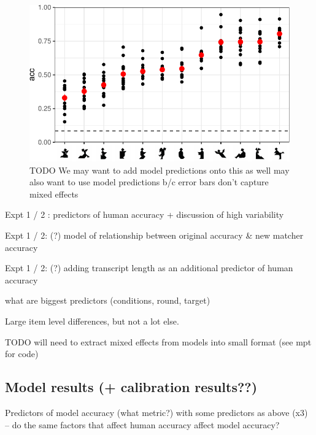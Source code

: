 \documentclass[10pt, letterpaper]{article}
\begin{document}
\begin{CodeChunk}
\begin{figure}[t]

{\centering \includegraphics[width=1\linewidth]{figs/fig-2-1} 

}

\caption[TODO We may want to add model predictions onto this as well may also want to use model predictions b/c error bars don't capture mixed effects \label{TODO2}]{TODO We may want to add model predictions onto this as well may also want to use model predictions b/c error bars don't capture mixed effects \label{TODO2}}\label{fig:fig-2}
\end{figure}
\end{CodeChunk}

Expt 1 / 2 : predictors of human accuracy + discussion of high
variability

Expt 1 / 2: (?) model of relationship between original accuracy \& new
matcher accuracy

Expt 1 / 2: (?) adding transcript length as an additional predictor of
human accuracy

what are biggest predictors (conditions, round, target)

Large item level differences, but not a lot else.

TODO will need to extract mixed effects from models into small format
(see mpt for code)

\subsection{Model results (+ calibration
results??)}\label{model-results-calibration-results}

Predictors of model accuracy (what metric?) with some predictors as
above (x3) -- do the same factors that affect human accuracy affect
model accuracy?
\end{document}
